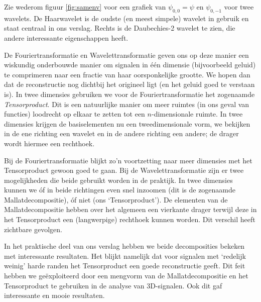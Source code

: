 Zie wederom figuur \ref{fig:samenv} voor een grafiek van $\psi_{0,0} = \psi$ en $\psi_{0,-1}$ voor twee wavelets. De Haarwavelet is de oudste (en meest simpele) wavelet in gebruik en staat centraal in ons verslag. 
Rechts is de Daubechies-2 wavelet te zien, die andere interessante eigenschappen heeft.

De Fouriertransformatie en Wavelettransformatie geven ons op deze manier een wiskundig onderbouwde manier om signalen in \'e\'en dimensie (bijvoorbeeld geluid) te comprimeren naar een fractie van haar oorsponkelijke grootte. We hopen dan dat de reconstructie nog dichtbij het origineel ligt (en het geluid goed te verstaan is). In twee dimensies gebruiken we voor de Fouriertransformatie het zogenaamde \emph{Tensorproduct}. Dit is een natuurlijke manier om meer ruimtes (in ons geval van functies) loodrecht op elkaar te zetten tot een $n$-dimensionale ruimte. In twee dimensies krijgen de basiselementen nu een tweedimensionale vorm, we bekijken in de ene richting een wavelet en in de andere richting een andere; de drager wordt hiermee een rechthoek.

Bij de Fouriertransformatie blijkt zo'n voortzetting naar meer dimensies met het Tensorproduct gewoon goed te gaan. Bij de Wavelettransformatie zijn er twee mogelijkheden die beide gebruikt worden in de praktijk. In twee dimensies kunnen we \'of in beide richtingen even snel inzoomen (dit is de zogenaamde Mallatdecompositie), \'of niet (ons `Tensorproduct').
De elementen van de Mallatdecompositie hebben over het algemeen een vierkante drager terwijl deze in het Tensorproduct een (langwerpige) rechthoek kunnen worden. Dit verschil heeft zichtbare gevolgen.

In het praktische deel van ons verslag hebben we beide decomposities bekeken met interessante resultaten. Het blijkt namelijk dat voor signalen met `redelijk weinig' harde randen het Tensorproduct een goede reconstructie geeft. Dit feit hebben we ge\"exploiteerd door een mengvorm van de Mallatdecompositie en het Tensorproduct te gebruiken in de analyse van 3D-signalen. Ook dit gaf interessante en mooie resultaten.

